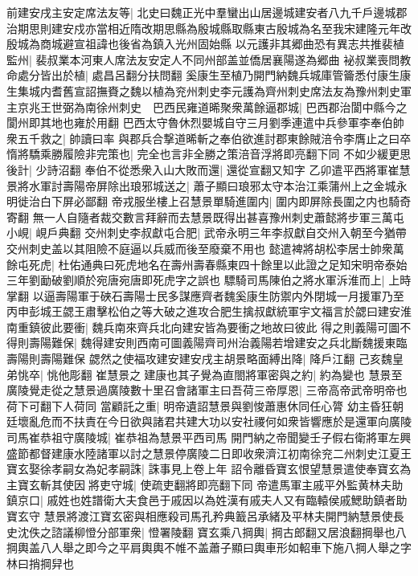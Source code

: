 前建安戌主安定席法友等|{
	北史曰魏正光中羣蠻出山居邊城建安者八九千戶邊城郡治期思則建安戍亦當相近隋改期思縣為殷城縣取縣東古殷城為名至我宋建隆元年改殷城為商城避宣祖諱也後省為鎮入光州固始縣}
以元護非其郷曲恐有異志共推裴植監州|{
	裴叔業本河東人席法友安定人不同州部盖並僑居襄陽遂為郷曲}
袐叔業喪問教命處分皆出於植|{
	處昌呂翻分扶問翻}
奚康生至植乃開門納魏兵城庫管籥悉付康生康生集城内耆舊宣詔撫賚之魏以植為兖州刺史李元護為齊州刺史席法友為豫州刺史軍主京兆王世弼為南徐州刺史　巴西民雍道晞聚衆萬餘逼郡城|{
	巴西郡治閬中縣今之閬州即其地也雍於用翻}
巴西太守魯休烈嬰城自守三月劉季連遣中兵參軍李奉伯帥衆五千救之|{
	帥讀曰率}
與郡兵合撃道晞斬之奉伯欲進討郡東餘賊涪令李膺止之曰卒惰將驕乘勝履險非完策也|{
	完全也言非全勝之策涪音浮將即亮翻下同}
不如少緩更思後計|{
	少詩沼翻}
奉伯不從悉衆入山大敗而還|{
	還從宣翻又知字}
乙卯遣平西將軍崔慧景將水軍討壽陽帝屏除出琅邪城送之|{
	蕭子顯曰琅邪太守本治江乘蒲州上之金城永明徙治白下屏必鄙翻}
帝戎服坐樓上召慧景單騎進圍内|{
	圍内即屏除長圍之内也騎奇寄翻}
無一人自隨者裁交數言拜辭而去慧景既得出甚喜豫州刺史蕭懿將步軍三萬屯小峴|{
	峴戶典翻}
交州刺史李叔獻屯合肥|{
	武帝永明三年李叔獻自交州入朝至今猶帶交州刺史盖以其阻險不庭逼以兵威而後至廢棄不用也}
懿遣裨將胡松李居士帥衆萬餘屯死虎|{
	杜佑通典曰死虎地名在壽州壽春縣東四十餘里以此證之足知宋明帝泰始三年劉勔破劉順於宛唐宛唐即死虎字之誤也}
驃騎司馬陳伯之將水軍泝淮而上|{
	上時掌翻}
以逼壽陽軍于硤石壽陽士民多謀應齊者魏奚康生防禦内外閉城一月援軍乃至丙申彭城王勰王肅擊松伯之等大破之進攻合肥生擒叔獻統軍宇文福言於勰曰建安淮南重鎮彼此要衝|{
	魏兵南來齊兵北向建安皆為要衝之地故曰彼此}
得之則義陽可圖不得則壽陽難保|{
	魏得建安則西南可圖義陽齊司州治義陽若增建安之兵北斷魏援東臨壽陽則壽陽難保}
勰然之使福攻建安建安戌主胡景略面縛出降|{
	降戶江翻}
己亥魏皇弟恌卒|{
	恌他彫翻}
崔慧景之建康也其子覺為直閤將軍密與之約|{
	約為變也}
慧景至廣陵覺走從之慧景過廣陵數十里召會諸軍主曰吾荷三帝厚恩|{
	三帝高帝武帝明帝也荷下可翻下人荷同}
當顧託之重|{
	明帝遺詔慧景與劉悛蕭惠休同任心膂}
幼主昏狂朝廷壞亂危而不扶責在今日欲與諸君共建大功以安社禝何如衆皆響應於是還軍向廣陵司馬崔恭祖守廣陵城|{
	崔恭祖為慧景平西司馬}
開門納之帝聞變壬子假右衛將軍左興盛節都督建康水陸諸軍以討之慧景停廣陵二日即收衆濟江初南徐兖二州刺史江夏王寶玄娶徐孝嗣女為妃孝嗣誅|{
	誅事見上卷上年}
詔令離昏寶玄恨望慧景遣使奉寶玄為主寶玄斬其使因將吏守城|{
	使疏吏翻將即亮翻下同}
帝遣馬軍主戚平外監黄林夫助鎮京口|{
	戚姓也姓譜衛大夫食邑于戚因以為姓漢有戚夫人又有臨轅侯戚鰓助鎮者助寶玄守}
慧景將渡江寶玄密與相應殺司馬孔矜典籖呂承緒及平林夫開門納慧景使長史沈佚之諮議柳憕分部軍衆|{
	憕署陵翻}
寶玄乘八掆輿|{
	掆古郎翻又居浪翻掆舉也八掆輿盖八人舉之即今之平肩輿輿不帷不盖蕭子顯曰輿車形如軺車下施八掆人舉之字林曰捎掆舁也}
